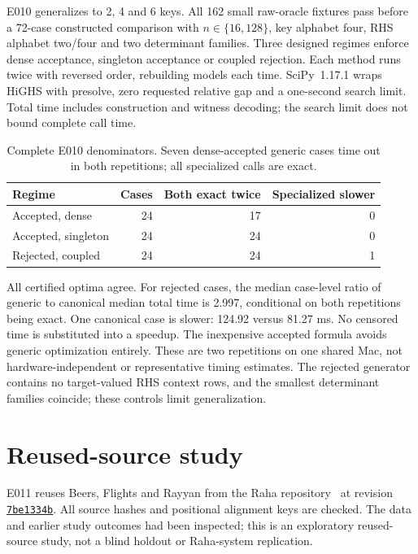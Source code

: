 \documentclass[11pt]{article}
\begin{document}
E010 generalizes to 2, 4 and 6 keys. All 162 small raw-oracle fixtures pass
before a 72-case constructed comparison with $n\in\{16,128\}$, key alphabet
four, RHS alphabet two/four and two determinant families. Three designed
regimes enforce dense acceptance, singleton acceptance or coupled rejection.
Each method runs twice with reversed order, rebuilding models each time.
SciPy~1.17.1 wraps HiGHS with presolve, zero requested relative gap and a
one-second search limit. Total time includes construction and witness decoding;
the search limit does not bound complete call time.

\begin{table}[H]
\centering\small
\begin{tabular}{lrrr}
\toprule
Regime & Cases & Both exact twice & Specialized slower\\
\midrule
Accepted, dense &24&17&0\\
Accepted, singleton &24&24&0\\
Rejected, coupled &24&24&1\\
\bottomrule
\end{tabular}
\caption{Complete E010 denominators. Seven dense-accepted generic cases time
out in both repetitions; all specialized calls are exact.}
\end{table}

All certified optima agree. For rejected cases, the median case-level ratio
of generic to canonical median total time is 2.997, conditional on both
repetitions being exact. One canonical case is slower: 124.92 versus 81.27 ms.
No censored time is substituted into a speedup. The inexpensive accepted
formula avoids generic optimization entirely. These are two repetitions on one
shared Mac, not hardware-independent or representative timing estimates.
The rejected generator contains no target-valued RHS context rows, and the
smallest determinant families coincide; these controls limit generalization.

\section{Reused-source study}
E011 reuses Beers, Flights and Rayyan from the Raha repository~\cite{raha} at
revision \href{https://github.com/BigDaMa/raha/tree/7be1334b8c7bbdac3f47ef514fb3e1e8c5fc181c}{\texttt{7be1334b}}.
All source hashes and positional alignment keys are checked. The data and
earlier study outcomes had been inspected; this is an exploratory reused-source
study, not a blind holdout or Raha-system replication.
\end{document}
